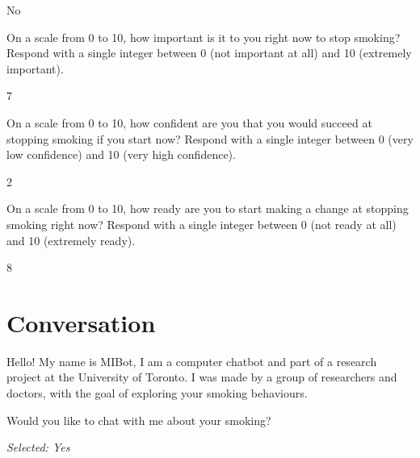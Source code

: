 \begin{clientbox}
No
\end{clientbox}

\begin{researcherbox}
On a scale from 0 to 10, how important is it to you right now to stop smoking? Respond with a single integer between 0 (not important at all) and 10 (extremely important).
\end{researcherbox}

\begin{clientbox}
7
\end{clientbox}

\begin{researcherbox}
On a scale from 0 to 10, how confident are you that you would succeed at stopping smoking if you start now? Respond with a single integer between 0 (very low confidence) and 10 (very high confidence).
\end{researcherbox}

\begin{clientbox}
2
\end{clientbox}

\begin{researcherbox}
On a scale from 0 to 10, how ready are you to start making a change at stopping smoking right now? Respond with a single integer between 0 (not ready at all) and 10 (extremely ready).
\end{researcherbox}

\begin{clientbox}
8
\end{clientbox}

\section*{Conversation}

\begin{counsellorbox}
Hello! My name is MIBot, I am a computer chatbot and part of a research project at the University of Toronto. I was made by a group of researchers and doctors, with the goal of exploring your smoking behaviours.
\end{counsellorbox}

\begin{counsellorbox}
Would you like to chat with me about your smoking?
\end{counsellorbox}

\begin{clientbox}
\textit{Selected: Yes}
\end{clientbox}

